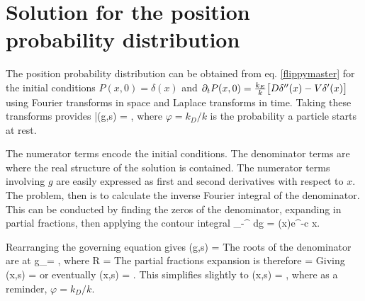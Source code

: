\section{Solution for the position probability distribution}
\label{sec:fluccymastersol}
The position probability distribution can be obtained from eq. \ref{flippymaster} for the initial conditions $P(x,0) = \delta(x)$ and $ \partial_t P(x,0) = \frac{k_E}{k}\big[D\delta''(x)-V \delta'(x) \big]$ using Fourier transforms in space and Laplace transforms in time. Taking these transforms provides
\be \bar{}(g,s) = , \ee
where $\varphi = k_D/k$ is the probability a particle starts at rest.

The numerator terms encode the initial conditions. The denominator terms are where the real structure of the solution is contained.
The numerator terms involving $g$ are easily expressed as first and second derivatives with respect to $x$. The problem, then is to calculate the inverse Fourier integral of the denominator.
This can be conducted by finding the zeros of the denominator, expanding in partial fractions, then applying the contour integral \citep[e.g.][]{Arfken1985}
\be \int_{-\infty}^\infty {}  dg = \theta(x)e^{-c x}.\ee

Rearranging the governing equation gives
\be {}(g,s) = \ee
The roots of the denominator are at
\be g_\pm = \Big[ 1  \pm R \Big],\ee
where
\be R = \ee
The partial fractions expansion is therefore
\be {} = \ee
Giving 
\be {}(x,s) = \ee
or eventually
\be {}(x,s) = .\ee
This simplifies slightly to
\be {}(x,s) = \exp{}, \label{eq:laplaceapp}\ee
where as a reminder, $\varphi = k_D/k$.

